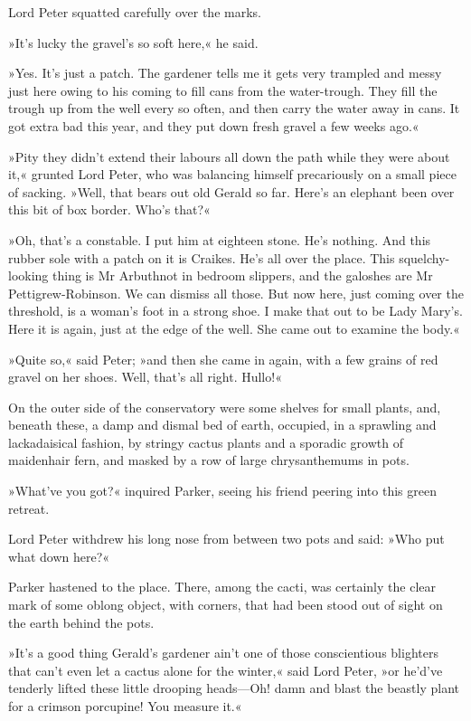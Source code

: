 Lord Peter squatted carefully over the marks.

»It's lucky the gravel's so soft here,« he said.

»Yes. It's just a patch. The gardener tells me it gets very trampled and messy just here owing to his coming to fill cans from the water-trough. They fill the trough up from the well every so often, and then carry the water away in cans. It got extra bad this year, and they put down fresh gravel a few weeks ago.«

»Pity they didn't extend their labours all down the path while they were about it,« grunted Lord Peter, who was balancing himself precariously on a small piece of sacking. »Well, that bears out old Gerald so far. Here's an elephant been over this bit of box border. Who's that?«

»Oh, that's a constable. I put him at eighteen stone. He's nothing. And this rubber sole with a patch on it is Craikes. He's all over the place. This squelchy-looking thing is Mr Arbuthnot in bedroom slippers, and the galoshes are Mr Pettigrew-Robinson. We can dismiss all those. But now here, just coming over the threshold, is a woman's foot in a strong shoe. I make that out to be Lady Mary's. Here it is again, just at the edge of the well. She came out to examine the body.«

»Quite so,« said Peter; »and then she came in again, with a few grains of red gravel on her shoes. Well, that's all right. Hullo!«

On the outer side of the conservatory were some shelves for small plants, and, beneath these, a damp and dismal bed of earth, occupied, in a sprawling and lackadaisical fashion, by stringy cactus plants and a sporadic growth of maidenhair fern, and masked by a row of large chrysanthemums in pots.

»What've you got?« inquired Parker, seeing his friend peering into this green retreat.

Lord Peter withdrew his long nose from between two pots and said: »Who put what down here?«

Parker hastened to the place. There, among the cacti, was certainly the clear mark of some oblong object, with corners, that had been stood out of sight on the earth behind the pots.

»It's a good thing Gerald's gardener ain't one of those conscientious blighters that can't even let a cactus alone for the winter,« said Lord Peter, »or he'd've tenderly lifted these little drooping heads—Oh! damn and blast the beastly plant for a crimson porcupine! You measure it.«

